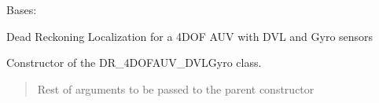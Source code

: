 \documentclass[letterpaper,10pt,english]{sphinxmanual}
\begin{document}
\begin{fulllineitems}
\label{\detokenize{DRLocalization:DR_4DOFAUV_DVLGyro.DR_4DOFAUV_DVLGyro}}
\pysigstartsignatures
{}
\pysigstopsignatures
\sphinxAtStartPar
Bases: {\hyperref[\detokenize{Localization:Localization.Localization}]{}}

\sphinxAtStartPar
Dead Reckoning Localization for a 4DOF AUV with DVL and Gyro sensors

\begin{fulllineitems}
\label{\detokenize{DRLocalization:DR_4DOFAUV_DVLGyro.DR_4DOFAUV_DVLGyro.__init__}}
\pysigstartsignatures
{}
\pysigstopsignatures
\sphinxAtStartPar
Constructor of the DR\_4DOFAUV\_DVLGyro class.
\begin{quote}\begin{description}
\sphinxAtStartPar
{} \textendash{} Rest of arguments to be passed to the parent constructor

\end{description}\end{quote}

\end{fulllineitems}



\end{fulllineitems}
\end{document}
